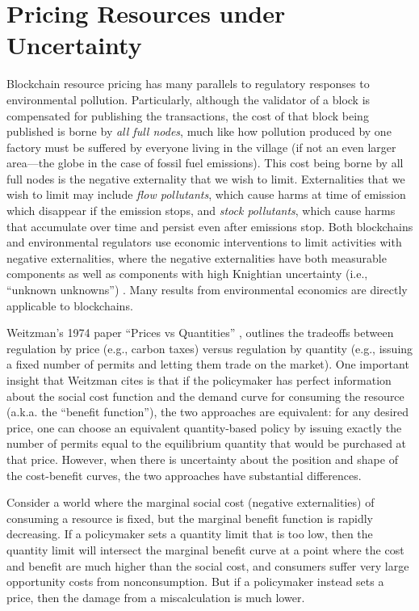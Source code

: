\documentclass[12pt, final]{article}
\begin{document}
\section{Pricing Resources under Uncertainty}
\label{sect:uncertainty}
Blockchain resource pricing has many parallels to regulatory responses to environmental pollution.  Particularly, although the validator of a block is compensated for publishing the transactions, the cost of that block being published is borne by \emph{all full nodes}, much like how pollution produced by one factory must be suffered by everyone living in the village (if not an even larger area—the globe in the case of fossil fuel emissions).  This cost being borne by all full nodes is the negative externality that we wish to limit.  Externalities that we wish to limit may include \emph{flow pollutants}, which cause harms at time of emission which disappear if the emission stops, and \emph{stock pollutants}, which cause harms that accumulate over time and persist even after emissions stop.  Both blockchains and environmental regulators use economic interventions to limit activities with negative externalities, where the negative externalities have both measurable components as well as components with high Knightian uncertainty (i.e., ``unknown unknowns'') \cite{knight1921risk}.  Many results from environmental economics \cite{barder14} are directly applicable to blockchains.

Weitzman's 1974 paper ``Prices vs Quantities'' \cite{weitzman1974prices}, outlines the tradeoffs between regulation by price (e.g., carbon taxes) versus regulation by quantity (e.g., issuing a fixed number of permits and letting them trade on the market). One important insight that Weitzman cites is that if the policymaker has perfect information about the social cost function and the demand curve for consuming the resource (a.k.a. the ``benefit function''), the two approaches are equivalent: for any desired price, one can choose an equivalent quantity-based policy by issuing exactly the number of permits equal to the equilibrium quantity that would be purchased at that price. However, when there is uncertainty about the position and shape of the cost-benefit curves, the two approaches have substantial differences.

Consider a world where the marginal social cost (negative externalities) of consuming a resource is fixed, but the marginal benefit function is rapidly decreasing. If a policymaker sets a quantity limit that is too low, then the quantity limit will intersect the marginal benefit curve at a point where the cost and benefit are much higher than the social cost, and consumers suffer very large opportunity costs from nonconsumption.  But if a policymaker instead sets a price, then the damage from a miscalculation is much lower.
\end{document}
